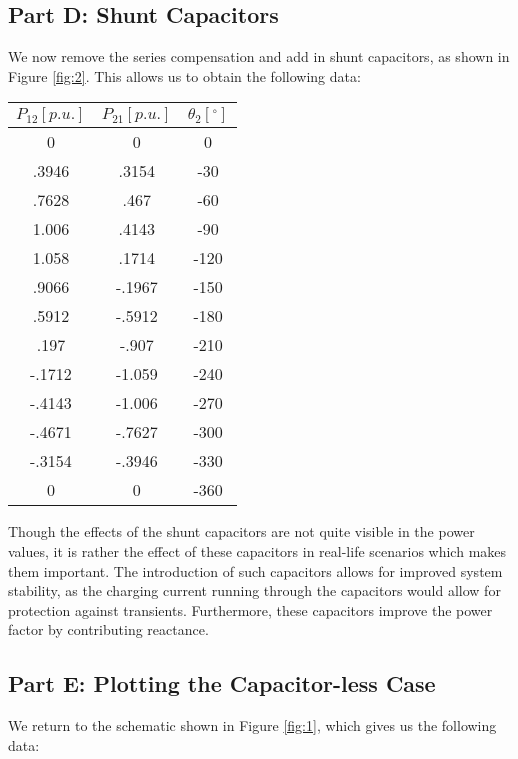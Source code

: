 \documentclass[
	letterpaper, %
	10pt, %
]{CSUniSchoolLabReport}
\begin{document}
\subsection{Part D: Shunt Capacitors}

We now remove the series compensation and add in shunt capacitors, as shown in Figure \ref{fig:2}. This allows us to obtain the following data:

\begin{center}
  \begin{tabular}[H]{|c|c|c|}
    \hline
    $P_{12}[p.u.]$ & $P_{21}[p.u.]$ & $\theta_2[^{\circ}]$\\
    \hline
    0 & 0 & 0\\
    \hline
    .3946 & .3154 & -30\\
    \hline
    .7628 & .467 & -60\\
    \hline
    1.006 & .4143 & -90\\
    \hline
    1.058  & .1714 & -120\\
    \hline
    .9066 & -.1967 & -150\\
    \hline
    .5912 & -.5912 & -180\\
    \hline
    .197 & -.907 & -210\\
    \hline
    -.1712 & -1.059 & -240\\
    \hline
    -.4143 & -1.006 & -270\\
    \hline
    -.4671 & -.7627 & -300\\
    \hline
    -.3154 & -.3946 & -330\\
    \hline
    0 & 0 & -360\\
    \hline
  \end{tabular}
\end{center}

Though the effects of the shunt capacitors are not quite visible in the power values, it is rather the effect of these capacitors in real-life scenarios which makes them important. The introduction of such capacitors allows for improved system stability, as the charging current running through the capacitors would allow for protection against transients. Furthermore, these capacitors improve the power factor by contributing reactance.

\subsection{Part E: Plotting the Capacitor-less Case}

We return to the schematic shown in Figure \ref{fig:1}, which gives us the following data:
\end{document}

